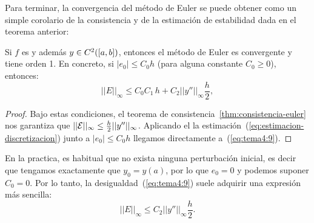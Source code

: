 Para terminar, la convergencia del método de Euler se puede obtener
como un simple corolario de la consistencia y de la estimación de
estabilidad dada en el teorema anterior:

\begin{corollary}
  \label{cor:euler:convergencia-y-orden}
  Si $f$ es \globLipschitz y además $y\in C^2([a,b])$, entonces el método de Euler es
  convergente y tiene orden 1. En concreto, si $|e_0|\le C_0 h$ (para
  alguna constante $C_0\ge 0$), entonces:
  \begin{equation}
    \label{eq:tema4:9}
    ||E||_\infty \le C_0 C_1 \, h + C_2 ||y''||_\infty \frac h2,
  \end{equation}
\end{corollary}

\begin{proof}
  Bajo estas condiciones, el teorema de
  consistencia~\ref{thm:consistencia-euler} nos garantiza que
  $||{\cal E}||_\infty \le \frac h2 ||y''||_\infty$. Aplicando el la
  estimación~(\ref{eq:estimacion-discretizacion}) junto a
  $|e_0|\le C_0 h$ llegamos directamente a~(\ref{eq:tema4:9}).
\end{proof}

\begin{remark}
  \label{rk:8}
  En la practica, es habitual que no exista ninguna perturbación
  inicial, es decir que tengamos exactamente que $y_0=y(a)$, por lo
  que $e_0=0$ y podemos suponer $C_0=0$. Por lo tanto, la
  desigualdad~(\ref{eq:tema4:9}) suele adquirir una expresión más
  sencilla:
    \begin{equation}
    \label{eq:tema4:9}
    ||E||_\infty \le C_2 ||y''||_\infty \frac h2.
  \end{equation}
\end{remark}




